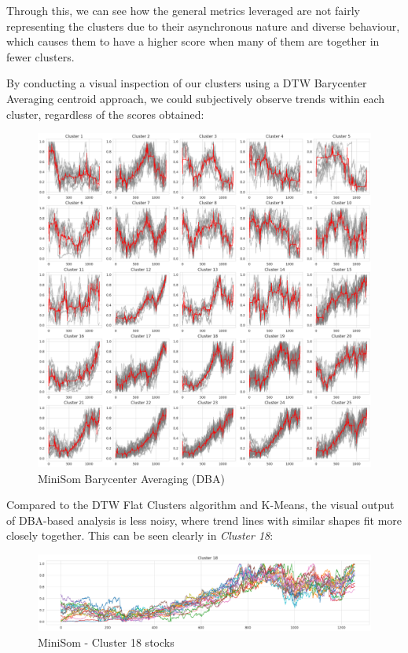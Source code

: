 \documentclass[11pt]{article}
\begin{document}
Through this, we can see how the general metrics leveraged are not fairly representing the clusters due to their asynchronous nature and diverse behaviour, which causes them to have a higher score when many of them are together in fewer clusters.

By conducting a visual inspection of our clusters using a  DTW Barycenter Averaging centroid approach, we could subjectively observe trends within each cluster, regardless of the scores obtained:

\begin{figure}[H]
\centering
\includegraphics[width=12cm]{img/MiniSom-dba.png} 
\caption{MiniSom Barycenter Averaging (DBA)}
\label{fig:minisom_dba}
\end{figure}

Compared to the DTW Flat Clusters algorithm and K-Means, the visual output of DBA-based analysis is less noisy, where trend lines with similar shapes fit more closely together. This can be seen clearly in \textit{Cluster 18}:

\begin{figure}[H]
\centering
\includegraphics[width=12cm]{img/minisom-cluster18.png} 
\caption{MiniSom - Cluster 18 stocks}

\end{figure}
\end{document}
